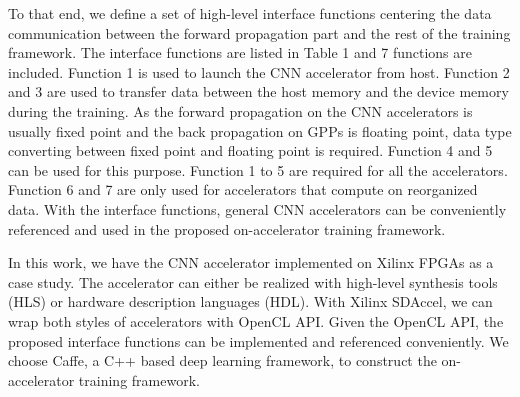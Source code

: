 To that end, we define a set of high-level interface functions
centering the data communication between the forward propagation part 
and the rest of the training framework. The interface functions are listed 
in Table 1 and 7 functions are included. Function 1 is used to launch the CNN accelerator from host. 
Function 2 and 3 are used to transfer data between the host memory and the device memory during 
the training. As the forward propagation on the CNN accelerators is usually fixed point 
and the back propagation on GPPs is floating point, data type converting between fixed point 
and floating point is required. Function 4 and 5 can be used for this purpose. 
Function 1 to 5 are required for all the accelerators. 
Function 6 and 7 are only used for accelerators that compute on reorganized data\cite{pipecnn_2,deepburing_12}. 
With the interface functions, general CNN accelerators can be conveniently 
referenced and used in the proposed on-accelerator training framework. 


In this work, we have the CNN accelerator implemented on Xilinx FPGAs as a case study. 
The accelerator can either be realized with high-level synthesis tools (HLS) or 
hardware description languages (HDL). With Xilinx SDAccel, we can wrap both 
styles of accelerators with OpenCL API. Given the OpenCL API,  
the proposed interface functions can be implemented and referenced conveniently. 
We choose Caffe, a C++ based deep learning framework, to construct the on-accelerator training framework.  

